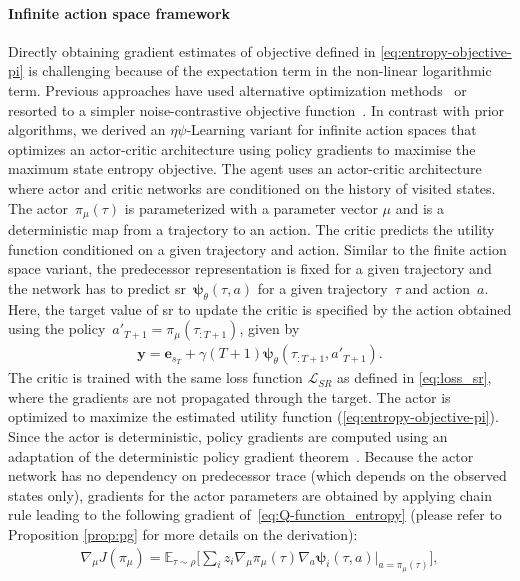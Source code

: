 \documentclass{article}
\theoremstyle{plain}
\theoremstyle{definition}
\theoremstyle{remark}
\newcommand{\alg}{$\eta$$\psi$-Learning}
\begin{document}
\paragraph{Infinite action space framework} 
Directly obtaining gradient estimates of objective defined in \autoref{eq:entropy-objective-pi} is challenging because of the expectation term in the non-linear logarithmic term. 
Previous approaches have used alternative optimization methods~\cite{lee2019efficient,pong2019skew} or resorted to a simpler noise-contrastive objective function~\cite{guo2021geometric}. 
In contrast with prior algorithms, we derived an \alg{} variant for infinite action spaces that optimizes an actor-critic architecture using policy gradients to maximise the maximum state entropy objective.
The agent uses an actor-critic architecture where actor and critic networks are conditioned on the history of visited states.
The actor~$\pi_{\mu}(\tau)$ is parameterized with a parameter vector $\mu$ and is a deterministic map from a trajectory to an action.
The critic predicts the utility function conditioned on a given trajectory and action.
Similar to the finite action space variant, the predecessor representation is fixed for a given trajectory and the network has to predict \gls{sr}~$\pmb{\psi}_{\theta}(\tau, a)$ for a given trajectory~$\tau$ and action~$a$.
Here, the target value of \gls{sr} to update the critic is specified by the action obtained using the policy~$a'_{T+1}=\pi_{\mu}(\tau_{:T+1})$, given by
\begin{align}
    \pmb{y} = \pmb{e}_{s_T} + \gamma(T+1)\pmb{\psi}_{\theta}(\tau_{:T+1}, a'_{T+1}).
\end{align}
The critic is trained with the same loss function $\mathcal{L}_{SR}$ as defined in \autoref{eq:loss_sr}, where the gradients are not propagated through the target.
The actor is optimized to maximize the estimated utility function (\autoref{eq:entropy-objective-pi}).
Since the actor is deterministic, policy gradients are computed using an adaptation of the deterministic policy gradient theorem~\cite{silver2014deterministic}.
Because the actor network has no dependency on predecessor trace (which depends on the observed states only), gradients for the actor parameters are obtained by applying chain rule leading to the following gradient of~\autoref{eq:Q-function_entropy} (please refer to Proposition \autoref{prop:pg} for more details on the derivation):
\begin{align}
    \label{eq:q_dpg}
    \nabla_{\mu} J(\pi_{\mu}) = \mathbb{E}_{\tau\sim\rho} \Big[ \sum_i z_i \nabla_{\mu} \pi_{\mu} (\tau) \nabla_a \pmb{\psi}_i(\tau,a) \big|_{a=\pi_{\mu}(\tau)}\Big],
\end{align}
\end{document}
